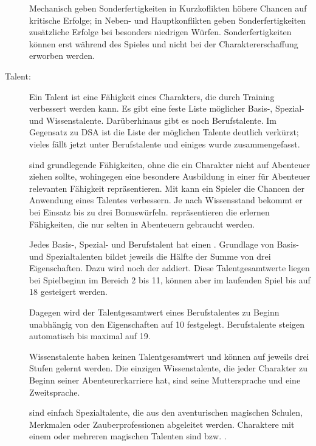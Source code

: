 \begin{description}
Mechanisch geben Sonderfertigkeiten in Kurzkoflikten höhere Chancen auf kritische Erfolge; in Neben- und Hauptkonflikten geben Sonderfertigkeiten zusätzliche Erfolge bei besonders niedrigen Würfen. Sonderfertigkeiten können erst während des Spieles und nicht bei der Charaktererschaffung erworben werden.

\item[Talent:] Ein Talent ist eine Fähigkeit eines Charakters, die durch Training verbessert werden kann. Es gibt eine feste Liste möglicher Basis-, Spezial- und Wissenstalente. Darüberhinaus gibt es noch Berufstalente. Im Gegensatz zu DSA ist die Liste der möglichen Talente deutlich verkürzt; vieles fällt jetzt unter Berufstalente und einiges wurde zusammengefasst.

 sind grundlegende Fähigkeiten, ohne die ein Charakter nicht auf Abenteuer ziehen sollte, wohingegen  eine besondere Ausbildung in einer für Abenteuer relevanten Fähigkeit repräsentieren. Mit  kann ein Spieler die Chancen der Anwendung eines Talentes verbessern. Je nach Wissensstand bekommt er bei Einsatz bis zu drei Bonuswürfeln.  repräsentieren die erlernen Fähigkeiten, die nur selten in Abenteuern gebraucht werden.

Jedes Basis-, Spezial- und Berufstalent hat einen . Grundlage von Basis- und Spezialtalenten bildet jeweils die Hälfte der Summe von drei Eigenschaften. Dazu wird noch der  addiert. Diese Talentgesamtwerte liegen bei Spielbeginn im Bereich 2 bis 11, können aber im laufenden Spiel bis auf 18 gesteigert werden.

Dagegen wird der Talentgesamtwert eines Berufstalentes zu Beginn unabhängig von den Eigenschaften auf 10 festgelegt. Berufstalente steigen automatisch bis maximal auf 19.

Wissenstalente haben keinen Talentgesamtwert und können auf jeweils drei Stufen gelernt werden. Die einzigen Wissenstalente, die jeder Charakter zu Beginn seiner Abenteurerkarriere hat, sind seine Muttersprache und eine Zweitsprache.

 sind einfach Spezialtalente, die aus den aventurischen magischen Schulen, Merkmalen oder Zauberprofessionen abgeleitet werden. Charaktere mit einem oder mehreren magischen Talenten sind  bzw. .


\end{description}
